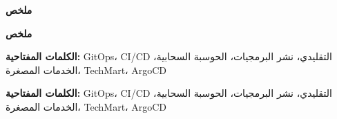 \thispagestyle{empty}
\vspace*{\fill}

\begin{center}
{\Large \textbf{\textarabic{ملخص}}}
\end{center}

\vspace{1cm}

\begin{otherlanguage}{arabic}
\begin{RTL}
\thispagestyle{empty}
\vspace*{\fill}

\begin{center}
{\Large \textbf{\textarabic{ملخص}}}
\end{center}

\vspace{1cm}

\begin{otherlanguage}{arabic}
\begin{RTL}

\textbf{الكلمات المفتاحية:} GitOps، CI/CD التقليدي، نشر البرمجيات، الحوسبة السحابية، الخدمات المصغرة، TechMart، ArgoCD
\end{RTL}
\end{otherlanguage}

\vspace*{\fill}
\newpage

\textbf{الكلمات المفتاحية:} GitOps، CI/CD التقليدي، نشر البرمجيات، الحوسبة السحابية، الخدمات المصغرة، TechMart، ArgoCD
\end{RTL}
\end{otherlanguage}

\vspace*{\fill}
\newpage